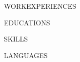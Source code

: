 \documentclass{moderncv}
\begin{document}
    \pagestyle{empty}  
    \maketitle
    \vspace{-10mm} 

    WORKEXPERIENCES

    EDUCATIONS

    SKILLS

    LANGUAGES
\end{document}
